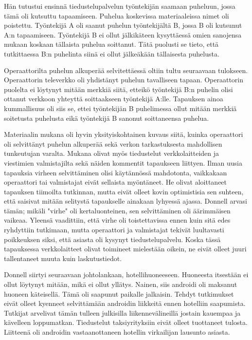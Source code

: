 Hän tutustui ensinnä tiedustelupalvelun työntekijän saamaan puheluun, jossa tämä oli kutsuttu tapaamiseen. Puhelua koskevissa materiaaleissa nimet oli poistettu. Työntekijä A oli saanut puhelun työntekijältä B, jossa B oli kutsunut A:n tapaamiseen. Työntekijä B ei ollut jälkikäteen kysyttäessä omien sanojensa mukaan koskaan tällaista puhelua soittanut. Tätä puolusti se tieto, että tutkittaessa B:n puhelinta siinä ei ollut jälkeäkään tällaisesta puhelusta.


Operaattorilta puhelun alkuperää selvitettäessä oltiin tultu seuraavaan tulokseen. Operaattorin televerkko oli yhdistänyt puhelun tavalliseen tapaan. Operaattorin puolelta ei löytynyt mitään merkkiä siitä, etteikö työntekijä B:n puhelin olisi ottanut verkkoon yhteyttä soittaakseen työntekijä A:lle. Tapauksen ainoa kummallisuus oli siis se, ettei työntekijän B puhelimessa ollut mitään merkkiä soitetusta puhelusta eikä työntekijä B sanonut soittaneensa puhelua.


Materiaalin mukana oli hyvin yksityiskohtainen kuvaus siitä, kuinka operaattori oli selvittänyt puhelun alkuperää sekä verkon tarkastuksesta mahdollisen tunkeutujan varalta. Mukana olivat myös tiedustelut verkkolaitteiden ja viestimien valmistajilta sekä näiden kommentit tapaukseen liittyen. Ilman uusia tapauksia virheen selvittäminen olisi käytännössä mahdotonta, vaikkakaan operaattori tai valmistajat eivät sellaista myöntäneet. He olivat aloittaneet tapauksen tiimoilta tutkinnan, mutta eivät olleet kovin optimistisia sen suhteen, että saisivat mitään selitystä tapaukselle ainakaan lyhyessä ajassa. Donnell arvasi tämän; mikäli "virhe" oli kertaluonteinen, sen selvittäminen oli äärimmäisen vaikeaa. Yleensä vaadittiin, että virhe oli toistettavissa ennen kuin sitä edes ryhdyttiin tutkimaan, mutta operaattori ja valmistajat tekivät luultavasti poikkeuksen siksi, että asiasta oli kysynyt tiedustelupalvelu. Koska tässä tapauksessa verkkolaitteet olivat toimineet mielestään oikein, ne eivät olleet juuri tallentaneet muuta kuin laskutustiedot.


Donnell siirtyi seuraavaan johtolankaan, hotellihuoneeseen. Huoneesta itsestään ei ollut löytynyt mitään, mikä ei ollut yllätys. Nainen, siis androidi oli maksanut huoneen käteisellä. Tämä oli saapunut paikalle jalkaisin. Tehdyt tutkimukset eivät olleet kyenneet selvittämään androidin liikkeitä ennen hotelliin saapumista. Tutkijat arvelivat tämän tulleen julkisilla liikennevälineillä jostain kauempaa ja kävelleen loppumatkan. Tiedustelut taksiyrityksiin eivät olleet tuottaneet tulosta. Liitteenä oli androidin vastaanottaneen hotellin virkailijan lausunto asiasta.


